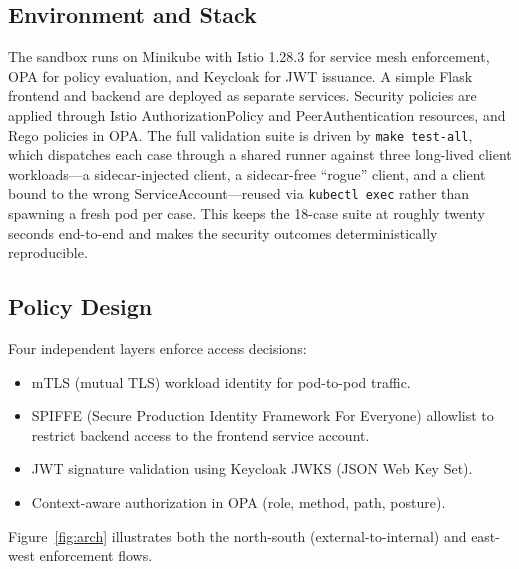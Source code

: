\documentclass[conference]{IEEEtran}
\begin{document}
\subsection{Environment and Stack}
The sandbox runs on Minikube with Istio 1.28.3 for service mesh enforcement, OPA for
policy evaluation, and Keycloak for JWT issuance. A simple Flask frontend and backend
are deployed as separate services. Security policies are applied through Istio
AuthorizationPolicy and PeerAuthentication resources, and Rego policies in OPA.
The full validation suite is driven by \texttt{make test-all}, which dispatches each
case through a shared runner against three long-lived client workloads---a
sidecar-injected client, a sidecar-free ``rogue'' client, and a client bound to the
wrong ServiceAccount---reused via \texttt{kubectl exec} rather than spawning a fresh
pod per case. This keeps the 18-case suite at roughly twenty seconds end-to-end and
makes the security outcomes deterministically reproducible.

\subsection{Policy Design}
Four independent layers enforce access decisions:
\begin{itemize}[noitemsep, topsep=3pt, parsep=0pt, partopsep=0pt]
  \item mTLS (mutual TLS) workload identity for pod-to-pod traffic.
  \item SPIFFE (Secure Production Identity Framework For Everyone) allowlist to restrict backend access to the frontend service account.
  \item JWT signature validation using Keycloak JWKS (JSON Web Key Set).
  \item Context-aware authorization in OPA (role, method, path, posture).
\end{itemize}
Figure~\ref{fig:arch} illustrates both the north-south (external-to-internal) and east-west enforcement flows.
\end{document}
